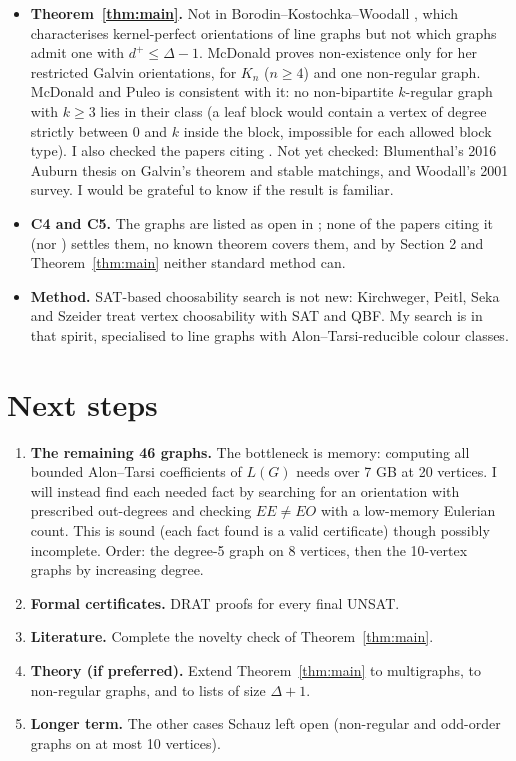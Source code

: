 \documentclass[11pt]{article}
\theoremstyle{plain}
\theoremstyle{definition}
\theoremstyle{remark}
\newcommand{\dout}{d^{+}}
\begin{document}
\begin{itemize}[leftmargin=*]
  \item \textbf{Theorem~\ref{thm:main}.} Not in Borodin--Kostochka--Woodall \cite{bkw}, which
        characterises kernel-perfect orientations of line graphs but not which graphs admit one
        with $\dout \le \Delta - 1$. McDonald \cite{mcd} proves non-existence only for her
        restricted Galvin orientations, for $K_n$ ($n \ge 4$) and one non-regular graph.
        McDonald and Puleo \cite{mp} is consistent with it: no non-bipartite $k$-regular graph
        with $k \ge 3$ lies in their class (a leaf block would contain a vertex of degree
        strictly between 0 and $k$ inside the block, impossible for each allowed block type).
        I also checked the papers citing \cite{bkw}. Not yet checked: Blumenthal's 2016 Auburn
        thesis on Galvin's theorem and stable matchings, and Woodall's 2001 survey. I would be
        grateful to know if the result is familiar.
  \item \textbf{C4 and C5.} The graphs are listed as open in \cite{schauz}; none of the papers
        citing it (nor \cite{jafari}) settles them, no known theorem covers them, and by
        Section 2 and Theorem~\ref{thm:main} neither standard method can.
  \item \textbf{Method.} SAT-based choosability search is not new: Kirchweger, Peitl, Seka and
        Szeider \cite{kpss} treat vertex choosability with SAT and QBF. My search is in that
        spirit, specialised to line graphs with Alon--Tarsi-reducible colour classes.
\end{itemize}

\section{Next steps}

\begin{enumerate}[leftmargin=*]
  \item \textbf{The remaining 46 graphs.} The bottleneck is memory: computing all bounded
        Alon--Tarsi coefficients of $L(G)$ needs over 7 GB at 20 vertices. I will instead find
        each needed fact by searching for an orientation with prescribed out-degrees and
        checking $EE \ne EO$ with a low-memory Eulerian count. This is sound (each fact found is
        a valid certificate) though possibly incomplete. Order: the degree-5 graph on 8 vertices,
        then the 10-vertex graphs by increasing degree.
  \item \textbf{Formal certificates.} DRAT proofs for every final UNSAT.
  \item \textbf{Literature.} Complete the novelty check of Theorem~\ref{thm:main}.
  \item \textbf{Theory (if preferred).} Extend Theorem~\ref{thm:main} to multigraphs, to
        non-regular graphs, and to lists of size $\Delta + 1$.
  \item \textbf{Longer term.} The other cases Schauz left open (non-regular and odd-order graphs on
        at most 10 vertices).
\end{enumerate}
\end{document}
